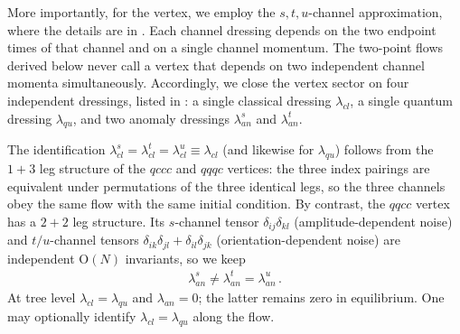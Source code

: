 \documentclass[reprint,english,superscriptaddress,preprintnumbers,amsmath,amssymb,aps,prd]{revtex4-1}
\begin{document}
More importantly, for the vertex, we employ the $s,t,u$-channel approximation, where the details are in . Each channel dressing depends on the two endpoint times of that channel and on a single channel momentum. The two-point flows derived below never call a vertex that depends on two independent channel momenta simultaneously. Accordingly, we close the vertex sector on four independent dressings, listed in : a single classical dressing $\lambda_{cl}$, a single quantum dressing $\lambda_{qu}$, and two anomaly dressings $\lambda_{an}^{s}$ and $\lambda_{an}^{t}$.

The identification $\lambda_{cl}^{s}=\lambda_{cl}^{t}=\lambda_{cl}^{u}\equiv\lambda_{cl}$ (and likewise for $\lambda_{qu}$) follows from the $1+3$ leg structure of the $qccc$ and $qqqc$ vertices: the three index pairings are equivalent under permutations of the three identical legs, so the three channels obey the same flow with the same initial condition. By contrast, the $qqcc$ vertex has a $2+2$ leg structure. Its $s$-channel tensor $\delta_{ij}\delta_{kl}$ (amplitude-dependent noise) and $t/u$-channel tensors $\delta_{ik}\delta_{jl}+\delta_{il}\delta_{jk}$ (orientation-dependent noise) are independent $\mathrm{O}(N)$ invariants, so we keep
\begin{align}
\lambda_{an}^{s}\neq\lambda_{an}^{t}=\lambda_{an}^{u}\,.
\label{eq:an-stu}
\end{align}
At tree level $\lambda_{cl}=\lambda_{qu}$ and $\lambda_{an}=0$; the latter remains zero in equilibrium. One may optionally identify $\lambda_{cl}=\lambda_{qu}$ along the flow.
\end{document}
